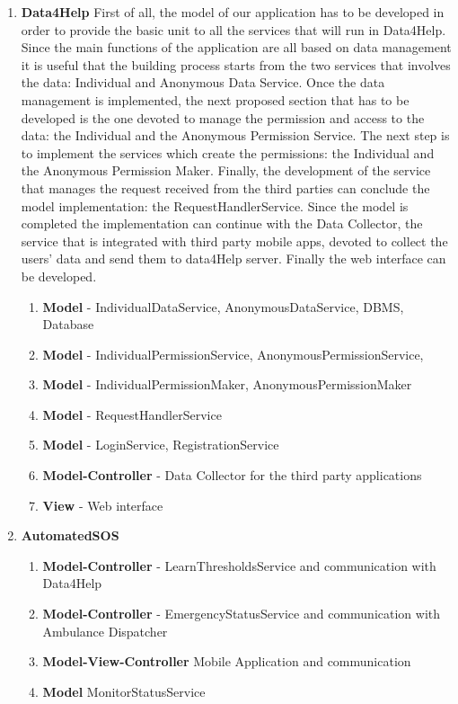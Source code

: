 \documentclass[a4paper]{article}
\begin{document}
\begin{enumerate}

\item \textbf{Data4Help} First of all, the model of our application has to be developed in order to provide the basic unit to all the services that will run in Data4Help. Since the main functions of the application are all based on data management it is useful that the building process starts from the two services that involves the data: Individual and Anonymous Data Service.
Once the data management is implemented, the next proposed section that has to be developed is the one devoted to manage the permission and access to the data: the Individual and the Anonymous Permission Service.
The next step is to implement the services which create the permissions: the Individual and the Anonymous Permission Maker. Finally, the development of the service that manages the request received from the third parties can conclude the model implementation: the RequestHandlerService.
Since the model is completed the implementation can continue with the Data Collector, the service that is integrated with third party mobile apps, devoted to collect the users' data and send them to data4Help server. Finally the web interface can be developed.


\begin{enumerate}
    \item \textbf{Model} - IndividualDataService, AnonymousDataService, DBMS, Database
    \item \textbf{Model} - IndividualPermissionService, AnonymousPermissionService, 
    \item \textbf{Model} - IndividualPermissionMaker, AnonymousPermissionMaker
    \item \textbf{Model} - RequestHandlerService
    \item \textbf{Model} - LoginService, RegistrationService
    \item \textbf{Model-Controller} - Data Collector for the third party applications
    \item \textbf{View} - Web interface
\end{enumerate}

\item \textbf{AutomatedSOS}


\begin{enumerate}
    \item \textbf{Model-Controller} - LearnThresholdsService and communication with Data4Help
    \item \textbf{Model-Controller} - EmergencyStatusService and communication with Ambulance Dispatcher
    \item \textbf{Model-View-Controller} Mobile Application and communication
    \item \textbf{Model} MonitorStatusService
\end{enumerate}


\end{enumerate}
\end{document}
